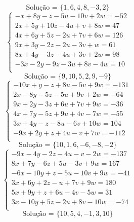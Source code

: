 \documentclass[12pt,oneside,a4paper]{article}
\begin{document}
\begin{equation*}
\text{Solução = }\{1,6,4,8,-3,2\}
\end{equation*}
\vspace{\baselineskip}
\begin{equation*}
\begin{cases}
-x+8y-z-5u-10v+2w=-52 \\
2x+5y+10z-4u+v+8w=47 \\
4x+6y+5z-2u+7v+6w=126 \\
9x+3y-2z-2u-3v+w=61 \\
8x+4y-3z-4u+3v+2w=98 \\
-3x-2y-9z-3u+8v-4w=10 \\
\end{cases}
\end{equation*}
\begin{equation*}
\text{Solução = }\{9,10,5,2,9,-9\}
\end{equation*}
\vspace{\baselineskip}
\begin{equation*}
\begin{cases}
-10x+y-z+8u-5v+9w=-131 \\
2x-8y-5z-5u+9v+2w=-64 \\
9x+2y-3z+6u+7v+9w=-36 \\
4x+7y-5z+9u+4v-7w=-55 \\
3x+4y-z-8u-6v+10w=104 \\
-9x+2y+z+4u-v+7w=-112 \\
\end{cases}
\end{equation*}
\begin{equation*}
\text{Solução = }\{10,1,6,-6,-8,-2\}
\end{equation*}
\vspace{\baselineskip}
\begin{equation*}
\begin{cases}
-9x-4y-2z-4u-v-2w=-137 \\
8x+7y-6z+5u-3v+9w=167 \\
-6x-10y+z-5u-10v+9w=-41 \\
3x+6y+2z-u+7v+9w=180 \\
5x+9y+z+6u-4v-5w=31 \\
3x-10y+5z-2u+8v-10w=-74 \\
\end{cases}
\end{equation*}
\begin{equation*}
\text{Solução = }\{10,5,4,-1,3,10\}
\end{equation*}
\end{document}

